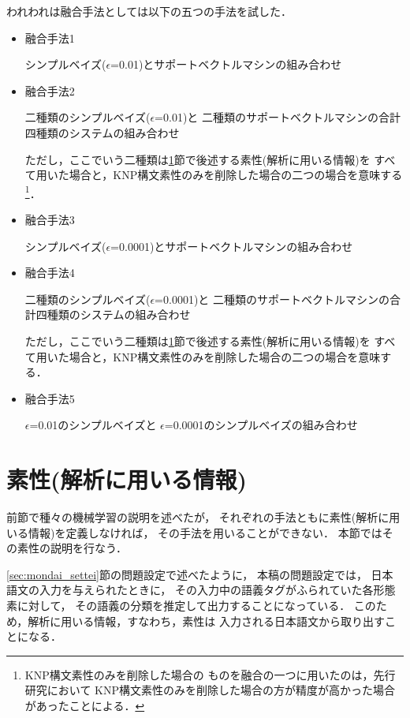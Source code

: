 われわれは融合手法としては以下の五つの手法を試した．
\begin{itemize}
\item 
  融合手法1 

  シンプルベイズ($\epsilon$=0.01)とサポートベクトルマシンの組み合わせ

\item 
  融合手法2

  二種類のシンプルベイズ($\epsilon$=0.01)と
  二種類のサポートベクトルマシンの合計四種類のシステムの組み合わせ

  ただし，ここでいう二種類は\ref{sec:sosei}節で後述する素性(解析に用いる情報)を
  すべて用いた場合と，KNP構文素性のみを削除した場合の二つの場合を意味する\footnote{KNP構文素性のみを削除した場合の
    ものを融合の一つに用いたのは，先行研究\cite{murata_nlc2001_wsd}において
    KNP構文素性のみを削除した場合の方が精度が高かった場合があったことによる．}．

\item 
  融合手法3

  シンプルベイズ($\epsilon$=0.0001)とサポートベクトルマシンの組み合わせ

\item 
  融合手法4

  二種類のシンプルベイズ($\epsilon$=0.0001)と
  二種類のサポートベクトルマシンの合計四種類のシステムの組み合わせ

  ただし，ここでいう二種類は\ref{sec:sosei}節で後述する素性(解析に用いる情報)を
  すべて用いた場合と，KNP構文素性のみを削除した場合の二つの場合を意味する．

\item 
  融合手法5

  $\epsilon$=0.01のシンプルベイズと
  $\epsilon$=0.0001のシンプルベイズの組み合わせ

\end{itemize}

\section{素性(解析に用いる情報)}
\label{sec:sosei}

前節で種々の機械学習の説明を述べたが，
それぞれの手法ともに素性(解析に用いる情報)を定義しなければ，
その手法を用いることができない．
本節ではその素性の説明を行なう．

\ref{sec:mondai_settei}節の問題設定で述べたように，
本稿の問題設定では，
日本語文の入力を与えられたときに，
その入力中の語義タグがふられていた各形態素に対して，
その語義の分類を推定して出力することになっている．
このため，解析に用いる情報，すなわち，素性は
入力される日本語文から取り出すことになる．

